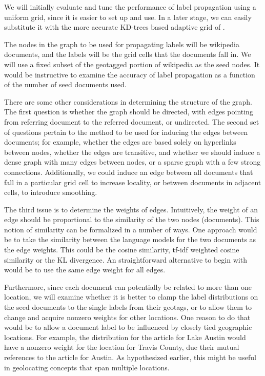\documentclass[11pt]{article}
\begin{document}
We will initially evaluate and tune the performance of label propagation using a uniform grid, since it is easier to set up and use. 
In a later stage, we can easily substitute it with the more accurate KD-trees based adaptive grid of \cite{rolleretal:12}.

The nodes in the graph to be used for propagating labels will be wikipedia documents, and the labels will be the grid cells that the documents fall in.
We will use a fixed subset of the geotagged portion of wikipedia as the seed nodes. It would be instructive to examine the accuracy of label propagation
as a function of the number of seed documents used. 

There are some other considerations in determining the structure of the graph. The first question is whether the graph should be directed, 
with edges pointing from referring document to the referred document, or undirected. The second set of questions pertain to the method to be used
for inducing the edges between documents; for example, whether the edges are based solely on hyperlinks between nodes, whether the edges are transitive, 
and whether we should induce a dense graph with many edges between nodes, or a sparse graph with a few strong connections. Additionally, we could induce 
an edge between all documents that fall in a particular grid cell to increase locality, or between documents in adjacent cells, to introduce smoothing.

The third issue is to determine the weights of edges. Intuitively, the weight of an edge should be proportional to the similarity of the two nodes (documents). 
This notion of similarity can be formalized in a number of ways. One approach would be to take the similarity between the language models for the 
two documents as the edge weights. This could be the cosine similarity, tf-idf weighted cosine similarity or the KL divergence.
An straightforward alternative to begin with would be to use the same edge weight for all edges. 
 
Furthermore, since each document can potentially be related to more than one location, we will examine whether it is better to clamp the label distributions 
on the seed documents to the single labels from their geotags, or to allow them to change and acquire nonzero weights for other locations.
One reason to do that would be to allow a document label to be influenced by closely tied geographic locations. For example, the distribution for the article for 
Lake Austin would have a nonzero weight for the location for Travis County, due their mutual references to the article for Austin. As hypothesized earlier, this
might be useful in geolocating concepts that span multiple locations.
\end{document}

